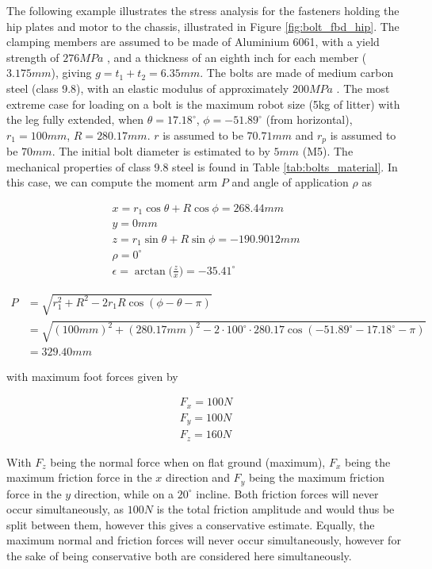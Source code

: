 The following example illustrates the stress analysis for the fasteners holding the hip plates and motor to the chassis, illustrated in Figure \ref{fig:bolt_fbd_hip}.
The clamping members are assumed to be made of Aluminium 6061, with a yield strength of $276MPa$ \cite{matweb_aluminum_nodate}, and a thickness of an eighth inch for each member ($3.175mm$), giving $g = t_1+t_2 = 6.35mm$.
The bolts are made of medium carbon steel (class 9.8), with an elastic modulus of approximately $200MPa$ \cite{azom_aisi_2012}.
The most extreme case for loading on a bolt is the maximum robot size (5kg of litter) with the leg fully extended, when $\theta = 17.18^{\circ}$, $\phi=-51.89^{\circ}$ (from horizontal), $r_1 = 100mm$, $R = 280.17mm$.
$r$ is assumed to be $70.71mm$ and $r_p$ is assumed to be $70mm$.
The initial bolt diameter is estimated to by $5mm$ (M5).
The mechanical properties of class 9.8 steel is found in Table \ref{tab:bolts_material}.
In this case, we can compute the moment arm $P$ and angle of application $\rho$ as

\begin{gather}
    x = r_1 \cos{\theta} + R\cos{\phi} = 268.44 mm
    \\
    y =  0 mm
    \\
    z = r_1 \sin{\theta} + R\sin{\phi} = -190.9012 mm
    \\
    \rho = 0^{\circ}
    \\
    \epsilon = \arctan \big( \frac{z}{x} \big) = -35.41^{\circ}
\end{gather}{}

\begin{equation}
    \begin{split}
        P   &= \sqrt{ r_1^2 + R^2 - 2 r_1 R \cos(\phi-\theta-\pi) } \\
            &= \sqrt{ (100mm)^2 + (280.17mm)^2 - 2\cdot 100^{\circ} \cdot 280.17 \cos(-51.89^{\circ} - 17.18^{\circ} - \pi)} \\
            &= 329.40 mm
    \end{split}
\end{equation}

with maximum foot forces given by

\begin{gather}
    F_x = 100N
    \\
    F_y = 100N
    \\
    F_z = 160N
\end{gather}{}

With $F_z$ being the normal force when on flat ground (maximum), $F_x$ being the maximum friction force in the $x$ direction and $F_y$ being the maximum friction force in the $y$ direction, while on a $20^{\circ}$ incline.
Both friction forces will never occur simultaneously, as $100N$ is the total friction amplitude and would thus be split between them, however this gives a conservative estimate.
Equally, the maximum normal and friction forces will never occur simultaneously, however for the sake of being conservative both are considered here simultaneously.

